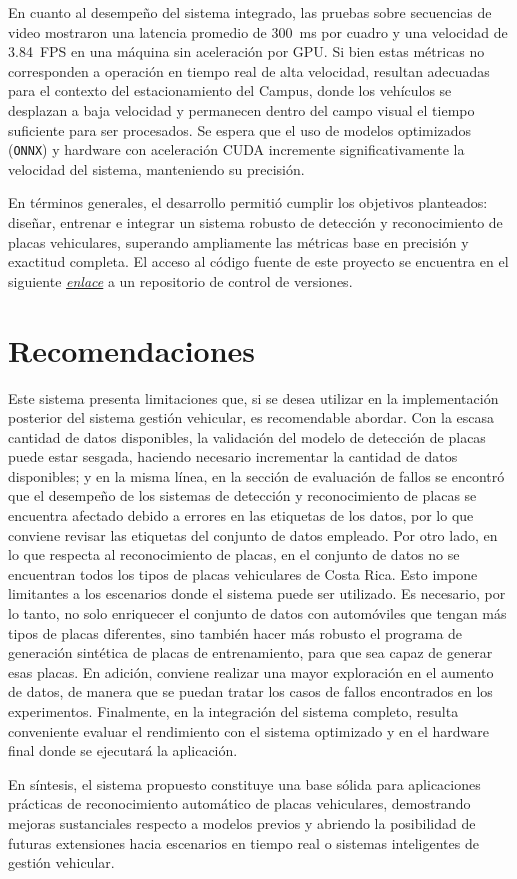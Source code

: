En cuanto al desempeño del sistema integrado,
las pruebas sobre secuencias de video mostraron una latencia promedio de 300~ms por cuadro y
una velocidad de 3.84~FPS en una máquina sin aceleración por GPU. 
Si bien estas métricas no corresponden a operación en tiempo real de alta velocidad,
resultan adecuadas para el contexto del estacionamiento del Campus,
donde los vehículos se desplazan a baja velocidad y 
permanecen dentro del campo visual el tiempo suficiente para ser procesados.
Se espera que el uso de modelos optimizados (\texttt{ONNX}) y
hardware con aceleración CUDA incremente significativamente la velocidad del sistema, manteniendo su precisión.

En términos generales, el desarrollo permitió cumplir los objetivos planteados:
diseñar, entrenar e integrar un sistema robusto de detección y
reconocimiento de placas vehiculares, superando ampliamente las métricas base en precisión y exactitud completa.
El acceso al código fuente de este proyecto se encuentra en el siguiente
\href{https://github.com/jcorea510/TFG-ANPR.git}{\textit{enlace}} a un repositorio de control de versiones.

\section{Recomendaciones}
Este sistema presenta limitaciones que,
si se desea utilizar en la implementación posterior del sistema gestión vehicular, es recomendable abordar.
Con la escasa cantidad de datos disponibles, la validación del modelo 
de detección de placas puede estar sesgada, haciendo necesario incrementar
la cantidad de datos disponibles; y en la misma línea, en 
la sección de evaluación de fallos se encontró que el desempeño
de los sistemas de detección y reconocimiento de placas
se encuentra afectado debido a errores en las etiquetas de los datos,
por lo que conviene revisar las etiquetas del conjunto de datos empleado.
Por otro lado, en lo que respecta al reconocimiento de placas, 
en el conjunto de datos no se encuentran todos los tipos de placas vehiculares de Costa Rica.
Esto impone limitantes a los escenarios donde el sistema puede ser utilizado.
Es necesario, por lo tanto, no solo enriquecer el conjunto de datos
con automóviles que tengan más tipos de placas diferentes, sino 
también hacer más robusto el programa de generación sintética de placas
de entrenamiento, para que sea capaz de generar esas placas.
En adición, conviene realizar una mayor exploración en el aumento de datos, 
de manera que se puedan tratar los casos de fallos encontrados en los experimentos.
Finalmente, en la integración del sistema completo, resulta conveniente
evaluar el rendimiento con el sistema optimizado y en el hardware final 
donde se ejecutará la aplicación.

En síntesis, el sistema propuesto constituye una base sólida para aplicaciones 
prácticas de reconocimiento automático de placas vehiculares,
demostrando mejoras sustanciales respecto a modelos previos y
abriendo la posibilidad de futuras extensiones hacia escenarios en tiempo real o
sistemas inteligentes de gestión vehicular.

